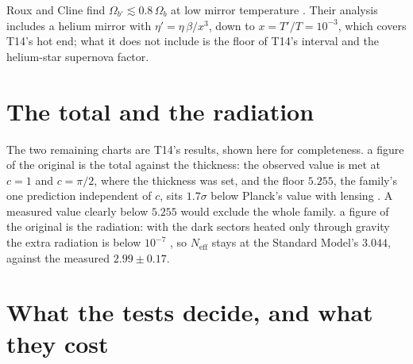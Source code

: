 \documentclass[11pt]{article}
\theoremstyle{definition}
\theoremstyle{plain}
\begin{document}
Roux and Cline find $\Omega_{b'} \lesssim 0.8\,\Omega_{b}$ at low mirror temperature \cite{RouxCline2020}. Their analysis includes a helium mirror with $\eta' = \eta\,\beta/x^{3}$, down to $x = T'/T = 10^{-3}$, which covers T14's hot end; what it does not include is the floor of T14's interval and the helium-star supernova factor.

\section{The total and the radiation}

\label{c:note.simulations.setting-total-radiation}
The two remaining charts are T14's results, shown here for completeness. a figure of the original is the total against the thickness: the observed value is met at $c = 1$ and $c = \pi/2$, where the thickness was set, and the floor $5.255$, the family's one prediction independent of $c$, sits $1.7\sigma$ below Planck's value with lensing \cite{Planck2018}. A measured value clearly below $5.255$ would exclude the whole family. a figure of the original is the radiation: with the dark sectors heated only through gravity the extra radiation is below $10^{-7}$ \cite[Props.~6.2 and 6.3]{ButlerT14}, so $N_{\mathrm{eff}}$ stays at the Standard Model's $3.044$, against the measured $2.99 \pm 0.17$.

\section{What the tests decide, and what they cost}
\end{document}
